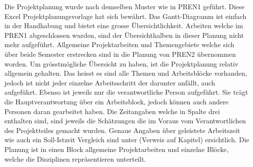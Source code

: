 Die Projektplanung wurde nach demselben Muster wie in PREN1 geführt. Diese Excel Projektplanungsvorlage hat sich bewährt. Das Gantt-Diagramm ist einfach in der Handhabung und bietet eine grosse Übersichtlichkeit. Arbeiten welche im PREN1 abgeschlossen wurden, sind der Übersichthalben in dieser Planung nicht mehr aufgeführt. Allgemeine Projektarbeiten und Themengebiete welche sich über beide Semester erstrecken sind in die Planung von PREN2 übernommen worden. Um grösstmögliche Übersicht zu haben, ist die Projektplanung relativ allgemein gehalten. Das heisst es sind alle Themen und Arbeitsblöcke vorhanden, jedoch ist nicht jeder einzelne Arbeitsschritt der darunter anfällt, auch aufgeführt. Ebenso ist jeweils nur die verantwortliche Person aufgeführt. Sie trägt die Hauptverantwortung über ein Arbeitsblock, jedoch können auch andere Personen daran gearbeitet haben. Die Zeitangaben welche in Spalte drei enthalten sind, sind jeweils die Schätzungen die im Voraus vom Verantwortlichen des Projektteiles gemacht wurden. Genaue Angaben über geleistete Arbeitszeit wie auch ein Soll-Istzeit Vergleich sind unter (Verweis auf Kapitel) ersichtlich. Die Planung ist in einen Block allgemeine Projektarbeiten und einzelne Blöcke, welche die Disziplinen repräsentieren unterteilt.

